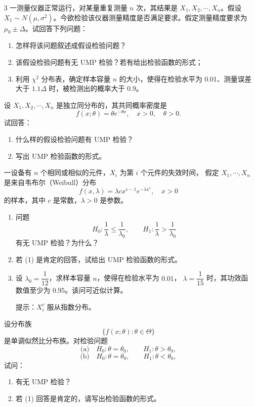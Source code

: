 \begin{homework}{3}
一测量仪器正常运行，对某量重复测量 $n$ 次，其结果是 $X_1, X_2, \cdots, X_n$。假设 $X_1 \sim N(\mu, \sigma^2)$。今欲检验该仪器测量精度是否满足要求。假定测量精度要求为 $\mu_0 \pm \Delta$。试回答下列问题：
\begin{enumerate}
    \item 怎样将该问题叙述成假设检验问题？
    \item 该假设检验问题有无 UMP 检验？若有给出检验函数的形式；
    \item 利用 $\chi^2$ 分布表，确定样本容量 $n$ 的大小，使得在检验水平为 0.01、测量误差大于 $1.1\Delta$ 时，被检测出的概率大于 0.9。
\end{enumerate}
\end{homework}
\begin{homework}[5]
设 $X_1,X_2,\cdots,X_n$ 是独立同分布的，其共同概率密度是
\[
    f(x;\theta)=\theta e^{-\theta x},\quad x>0,\quad \theta>0.
\]
试回答：
\begin{enumerate}
    \item 什么样的假设检验问题有 UMP 检验？
    \item 写出 UMP 检验函数的形式。
\end{enumerate}
\end{homework}

\begin{homework}[6]
一设备有 $n$ 个相同或相似的元件，$X_i$ 为第 $i$ 个元件的失效时间，
假定 $X_1,\cdots,X_n$ 是来自韦布尔（Weibull）分布
\[
    f(x,\lambda)=\lambda c x^{c-1}e^{-\lambda x^c},\quad x>0
\]
的样本，其中 $c$ 是常数，$\lambda>0$ 是参数。

\begin{enumerate}
    \item 问题
    \[
        H_0:\frac{1}{\lambda}\leq \frac{1}{\lambda_0},
        \qquad
        H_1:\frac{1}{\lambda}>\frac{1}{\lambda_0}
    \]
    有无 UMP 检验？为什么？

    \item 若 (1) 是肯定的回答，试给出 UMP 检验函数的形式。

    \item 设 $\lambda_0=\dfrac{1}{12}$，求样本容量 $n$，使得在检验水平为 $0.01$，
    $\lambda=\dfrac{1}{15}$ 时，其功效函数值至少为 $0.95$。该问可近似计算。

    提示：$X_i^c$ 服从指数分布。
\end{enumerate}
\end{homework}

\begin{homework}[7]
设分布族
\[
    \{f(x;\theta):\theta\in\Theta\}
\]
是单调似然比分布族。对检验问题
\[
    \text{(a)}\quad H_0:\theta=\theta_0,\qquad H_1:\theta>\theta_0,
\]
\[
    \text{(b)}\quad H_0:\theta=\theta_0,\qquad H_1:\theta<\theta_0,
\]
试问：
\begin{enumerate}
    \item 有无 UMP 检验？
    \item 若 (1) 回答是肯定的，请写出检验函数的形式。
\end{enumerate}
\end{homework}

